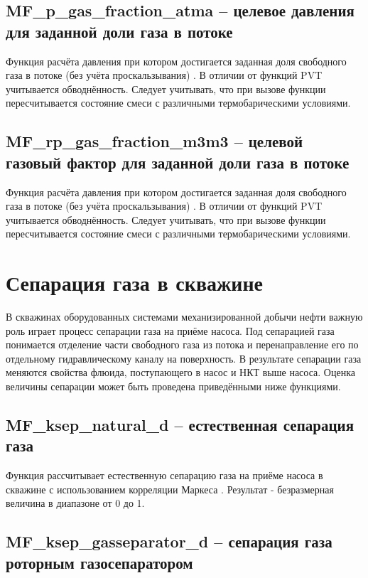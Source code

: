\subsection{MF\_p\_gas\_fraction\_atma – целевое давления для заданной доли газа в потоке}
Функция расчёта давления при котором достигается заданная доля свободного газа в потоке (без учёта проскальзывания) . 
В отличии от функций PVT учитывается обводнённость.
Следует учитывать, что при вызове функции пересчитывается состояние смеси с различными термобарическими условиями.

\subsection{MF\_rp\_gas\_fraction\_m3m3 – целевой газовый фактор для заданной доли газа в потоке}
Функция расчёта давления при котором достигается заданная доля свободного газа в потоке (без учёта проскальзывания) . 
В отличии от функций PVT учитывается обводнённость.
Следует учитывать, что при вызове функции пересчитывается состояние смеси с различными термобарическими условиями.

\section{Сепарация газа в скважине}

В скважинах оборудованных системами механизированной добычи нефти важную роль играет процесс сепарации газа на приёме насоса. Под сепарацией газа понимается отделение части свободного газа из потока и перенаправление его по отдельному гидравлическому каналу на поверхность. В результате сепарации газа меняются свойства флюида, поступающего в насос и НКТ выше насоса. Оценка величины сепарации может быть проведена приведёнными ниже функциями.

\subsection{MF\_ksep\_natural\_d – естественная сепарация газа}

Функция рассчитывает естественную сепарацию газа на приёме насоса в скважине с использованием корреляции Маркеса \cite{Marquez_2003} . Результат - безразмерная величина в диапазоне от 0 до 1. 



\subsection{MF\_ksep\_gasseparator\_d – сепарация газа роторным газосепаратором}

